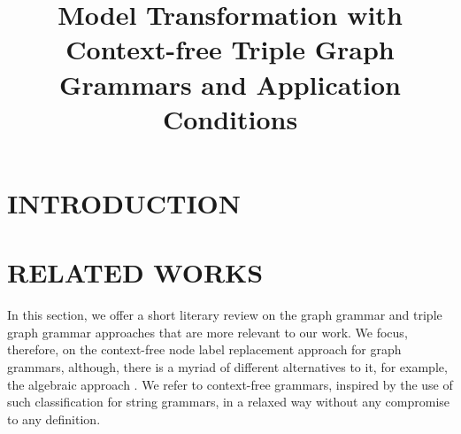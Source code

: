 \documentclass[a4paper,twoside]{article}
\begin{document}
\title{Model Transformation with Context-free Triple Graph Grammars and Application Conditions}



\abstract{}

\onecolumn \maketitle \normalsize \vfill

\section{\uppercase{Introduction}}

\noindent 



\section{\uppercase{Related Works}}

\noindent In this section, we offer a short literary review on the graph grammar and triple graph grammar approaches that are more relevant to our work. We focus, therefore, on the context-free node label replacement approach for graph grammars, although, there is a myriad of different alternatives to it, for example, the algebraic approach \cite{ehrig1999handbook}. We refer to context-free grammars, inspired by the use of such classification for string grammars, in a relaxed way without any compromise to any definition.

\end{document}

